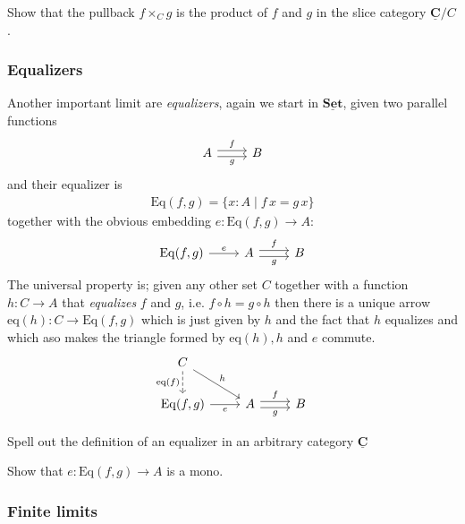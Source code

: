 \documentclass{article}
\newcommand{\cat}[1]{\underline{\mathbf{#1}}}
\newcommand{\Eq}[2]{\mathrm{Eq}(#1,#2)}
\newcommand{\eq}[1]{\mathrm{eq}(#1)}
\begin{document}
\begin{Exercise}
  Show that the pullback $f \times_C g$ is the product of $f$ and $g$ in the slice category $\cat{C}/C$.
\end{Exercise}

\subsubsection*{Equalizers}
\label{sec:equalizers}

Another important limit are \emph{equalizers}, again we start in $\cat{Set}$, given two parallel functions
\[\begin{tikzcd}
  A \arrow[r,"f",shift left] \arrow[r,"g" below,shift right]& B 
\end{tikzcd}\]
and their equalizer is 
\begin{align*}
\Eq{f}{g}  = \{ x : A \mid f\,x = g\,x \}
\end{align*}
together with the obvious embedding $e : \Eq{f}{g} \to A$:
\[\begin{tikzcd}
  \Eq{f}{g} \arrow[r,"e"] & A \arrow[r,"f",shift left] \arrow[r,"g" below,shift right]& B 
\end{tikzcd}\]
The universal property is; given any other set $C$ together with a function $h : C \to A$ that \emph{equalizes} $f$ and $g$, i.e. $f \circ h = g \circ h$ then there is a unique arrow $\eq{h} : C \to \Eq{f}{g}$ which is just given by $h$ and the fact that $h$ equalizes and which aso makes the triangle formed by $\eq{h},h$ and $e$ commute.
\[\begin{tikzcd}
    C \arrow[dr,"h"] \arrow[d, dashrightarrow,"\eq{f}" left] \\
  \Eq{f}{g} \arrow[r,"e" below] & A \arrow[r,"f",shift left] \arrow[r,"g" below,shift right]& B 
\end{tikzcd}\]

\begin{Exercise}
  Spell out the definition of an equalizer in an arbitrary category $\cat{C}$
\end{Exercise}

\begin{Exercise}
  Show that  $e : \Eq{f}{g} \to A$ is a mono.
\end{Exercise}

\subsubsection*{Finite limits}
\label{sec:finite-limits}
\end{document}

